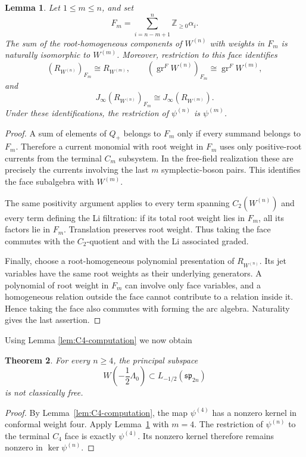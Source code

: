 \documentclass[11pt]{amsart}
\newtheorem{theorem}{Theorem}[section]
\newtheorem{lemma}[theorem]{Lemma}
\theoremstyle{definition}
\theoremstyle{remark}
\newcommand{\spalg}{\mathfrak{sp}}
\DeclareMathOperator{\gr}{gr}
\begin{document}
\begin{lemma}\label{lem:terminal-Levi-face}
Let \(1\leq m\leq n\), and set
\[
F_m=
\sum_{i=n-m+1}^{n}\mathbb Z_{\geq0}\alpha_i.
\]
The sum of the root-homogeneous components of \(W^{(n)}\) with
weights in \(F_m\) is naturally isomorphic to \(W^{(m)}\).
Moreover, restriction to this face identifies
\[
(R_{W^{(n)}})_{F_m}\cong R_{W^{(m)}},
\qquad
(\gr^F W^{(n)})_{F_m}
\cong\gr^F W^{(m)},
\]
and
\[
J_\infty(R_{W^{(n)}})_{F_m}
\cong J_\infty(R_{W^{(m)}}).
\]
Under these identifications, the restriction of \(\psi^{(n)}\)
is \(\psi^{(m)}\).
\end{lemma}

\begin{proof}
A sum of elements of \(Q_+\) belongs to \(F_m\) only if every
summand belongs to \(F_m\).
Therefore a current monomial with root weight in \(F_m\) uses
only positive-root currents from the terminal \(C_m\) subsystem.
In the free-field realization these are precisely the currents
involving the last \(m\) symplectic-boson pairs.
This identifies the face subalgebra with \(W^{(m)}\).

The same positivity argument applies to every term spanning
\(C_2(W^{(n)})\) and every term defining the Li filtration:
if its total root weight lies in \(F_m\), all its factors lie
in \(F_m\). Translation preserves root weight.
Thus taking the face commutes with the \(C_2\)-quotient and with
the Li associated graded.

Finally, choose a root-homogeneous polynomial presentation of
\(R_{W^{(n)}}\). Its jet variables have the same root weights as
their underlying generators. A polynomial of root weight in
\(F_m\) can involve only face variables, and a homogeneous
relation outside the face cannot contribute to a relation
inside it. Hence taking the face also commutes with forming
the arc algebra. Naturality gives the last assertion.
\end{proof}



Using Lemma \ref{lem:C4-computation} we now obtain
\begin{theorem}
\label{thm:Cn-not-classically-free}
For every \(n\geq4\), the principal subspace
\[
W(-\frac12\Lambda_0)\subset L_{-1/2}(\spalg_{2n})
\]
is not classically free.
\end{theorem}

\begin{proof}
By Lemma~\ref{lem:C4-computation}, the map \(\psi^{(4)}\) has a
nonzero kernel in conformal weight four.
Apply Lemma~\ref{lem:terminal-Levi-face} with \(m=4\).
The restriction of \(\psi^{(n)}\) to the terminal \(C_4\) face
is exactly \(\psi^{(4)}\). Its nonzero kernel therefore remains
nonzero in \(\ker\psi^{(n)}\).
\end{proof}
\end{document}
